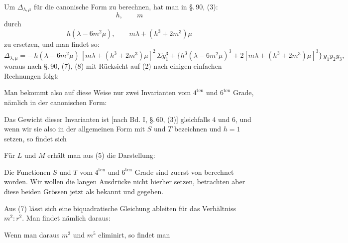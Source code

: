 
Um $\varDelta_{\lambda,\mu}$ für die canonische Form zu berechnen, hat man
in \S.\,90, (3):
\[
h, \qquad m
\]
durch
\[
h(\lambda-6m^2\mu), \qquad m\lambda+(h^3+2m^3)\mu
\]
zu ersetzen, und man findet so:
\[
\varDelta_{\lambda,\mu} = -\,h(\lambda-6m^2\mu)\,[m\lambda+(h^3+2m^3)\mu]^2\,\Sigma y_1^3
+ \{h^3(\lambda-6m^2\mu)^3+2[m\lambda+(h^3+2m^3)\mu]^3\}\,y_1y_2y_3,
\]
woraus nach \S.\,90, (7), (8) mit Rücksicht auf (2) nach einigen
einfachen Rechnungen folgt:

Man bekommt also auf diese Weise nur zwei Invarianten vom
$4^{\mathrm{ten}}$ und $6^{\mathrm{ten}}$ Grade, nämlich in der canonischen Form:

Das Gewicht dieser Invarianten ist [nach Bd. I, \S.\,60, (3)]
gleichfalls 4 und 6, und wenn wir sie also in der allgemeinen
Form mit $S$ und $T$ bezeichnen und $h=1$ setzen, so findet sich

Für $L$ und $M$ erhält man aus (5) die Darstellung:

Die Functionen $S$ und $T$ vom $4^{\mathrm{ten}}$ und $6^{\mathrm{ten}}$ Grade sind
zuerst von  berechnet worden. Wir wollen die langen
Ausdrücke nicht hierher setzen, betrachten aber diese beiden
Grössen jetzt als bekannt und gegeben.

Aus (7) lässt sich eine biquadratische Gleichung ableiten
für das Verhältniss $m^2:r^2$. Man findet nämlich daraus:

Wenn man daraus $m^2$ und $m^5$ eliminirt, so findet man

